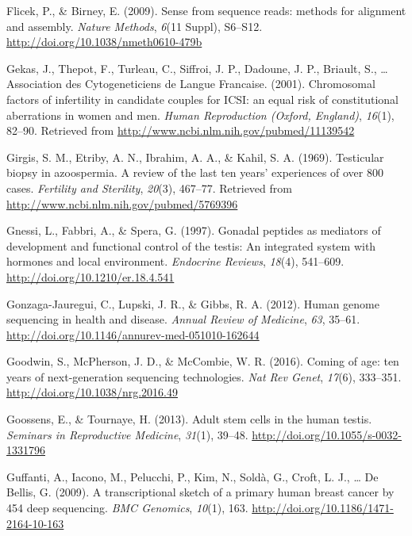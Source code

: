 \documentclass[12pt,twoside]{reedthesis}
\theoremstyle{definition}
\theoremstyle{definition}
\theoremstyle{remark}
\begin{document}
  \hypertarget{ref-Flicek2009}{}
  Flicek, P., \& Birney, E. (2009). Sense from sequence reads: methods for
  alignment and assembly. \emph{Nature Methods}, \emph{6}(11 Suppl),
  S6--S12. \url{http://doi.org/10.1038/nmeth0610-479b}
  
  \hypertarget{ref-Gekas2001}{}
  Gekas, J., Thepot, F., Turleau, C., Siffroi, J. P., Dadoune, J. P.,
  Briault, S., \ldots{} Association des Cytogeneticiens de Langue
  Francaise. (2001). Chromosomal factors of infertility in candidate
  couples for ICSI: an equal risk of constitutional aberrations in women
  and men. \emph{Human Reproduction (Oxford, England)}, \emph{16}(1),
  82--90. Retrieved from \url{http://www.ncbi.nlm.nih.gov/pubmed/11139542}
  
  \hypertarget{ref-Girgis}{}
  Girgis, S. M., Etriby, A. N., Ibrahim, A. A., \& Kahil, S. A. (1969).
  Testicular biopsy in azoospermia. A review of the last ten years'
  experiences of over 800 cases. \emph{Fertility and Sterility},
  \emph{20}(3), 467--77. Retrieved from
  \url{http://www.ncbi.nlm.nih.gov/pubmed/5769396}
  
  \hypertarget{ref-Gnessi1997}{}
  Gnessi, L., Fabbri, A., \& Spera, G. (1997). Gonadal peptides as
  mediators of development and functional control of the testis: An
  integrated system with hormones and local environment. \emph{Endocrine
  Reviews}, \emph{18}(4), 541--609.
  \url{http://doi.org/10.1210/er.18.4.541}
  
  \hypertarget{ref-Gonzaga-Jauregui2012}{}
  Gonzaga-Jauregui, C., Lupski, J. R., \& Gibbs, R. A. (2012). Human
  genome sequencing in health and disease. \emph{Annual Review of
  Medicine}, \emph{63}, 35--61.
  \url{http://doi.org/10.1146/annurev-med-051010-162644}
  
  \hypertarget{ref-Goodwin2016}{}
  Goodwin, S., McPherson, J. D., \& McCombie, W. R. (2016). Coming of age:
  ten years of next-generation sequencing technologies. \emph{Nat Rev
  Genet}, \emph{17}(6), 333--351. \url{http://doi.org/10.1038/nrg.2016.49}
  
  \hypertarget{ref-Goossens2013}{}
  Goossens, E., \& Tournaye, H. (2013). Adult stem cells in the human
  testis. \emph{Seminars in Reproductive Medicine}, \emph{31}(1), 39--48.
  \url{http://doi.org/10.1055/s-0032-1331796}
  
  \hypertarget{ref-Guffanti2009}{}
  Guffanti, A., Iacono, M., Pelucchi, P., Kim, N., Soldà, G., Croft, L.
  J., \ldots{} De Bellis, G. (2009). A transcriptional sketch of a primary
  human breast cancer by 454 deep sequencing. \emph{BMC Genomics},
  \emph{10}(1), 163. \url{http://doi.org/10.1186/1471-2164-10-163}
  
\end{document}
